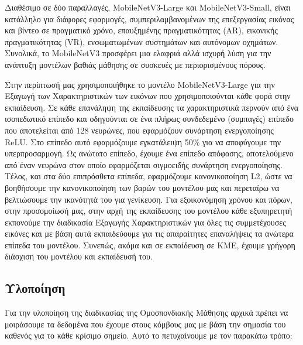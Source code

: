 Διαθέσιμο σε δύο παραλλαγές, MobileNetV3-Large και MobileNetV3-Small, είναι κατάλληλο για διάφορες εφαρμογές, συμπεριλαμβανομένων της επεξεργασίας εικόνας και βίντεο σε πραγματικό χρόνο, επαυξημένης πραγματικότητας (AR), εικονικής πραγματικότητας (VR), ενσωματωμένων συστημάτων και αυτόνομων οχημάτων. Συνολικά, το MobileNetV3 προσφέρει μια ελαφριά αλλά ισχυρή λύση για την ανάπτυξη μοντέλων βαθιάς μάθησης σε συσκευές με περιορισμένους πόρους.

Στην περίπτωσή μας χρησιμοποιήθηκε το μοντέλο MobileNetV3-Large για την Εξαγωγή των Χαρακτηριστικών των εικόνων που χρησιμοποιούνται κάθε φορά στην εκπαίδευση. Σε κάθε επανάληψη της εκπαίδευσης τα χαρακτηριστικά περνούν από ένα ισοπεδωτικό επίπεδο και οδηγούνται σε ένα πλήρως συνδεδεμένο (συμπαγές) επίπεδο που αποτελείται από 128 νευρώνες, που εφαρμόζουν συνάρτηση ενεργοποίησης ReLU. Στο επίπεδο αυτό εφαρμόζουμε εγκατάλειψη 50\% για να αποφύγουμε την υπερπροσαρμογή. Ως ανώτατο επίπεδο, έχουμε ένα επίπεδο απόφασης, αποτελούμενο από έναν νευρώνα στον οποίο εφαρμόζεται σιγμοειδής συνάρτηση ενεργοποίησης. Τέλος, και στα δύο επιπρόσθετα επίπεδα, εφαρμόζουμε κανονικοποίηση L2, ώστε να βοηθήσουμε την κανονικοποίηση των βαρών του μοντέλου μας και περεταίρω να βελτιώσουμε την ικανότητά του για γενίκευση. Για εξοικονόμηση χρόνου και πόρων, στην προσομοίωσή μας, στην αρχή της εκπαίδευσης του μοντέλου κάθε εξυπηρετητή εκπονούμε την διαδικασία Εξαγωγής Χαρακτηριστικών για όλες τις συμμετέχουσες εικόνες και με βάση αυτά εκπαιδεύουμε για τις απαραίτητες επαναλήψεις τα ανώτερα επίπεδα του μοντέλου. Συνεπώς, ακόμα και σε εκπαίδευση σε ΚΜΕ, έχουμε γρήγορη διάσχιση του μοντέλου και εκπαίδευσή του.

\subsection{Υλοποίηση}

\vspace{-3pt}

Για την υλοποίηση της διαδικασίας της Ομοσπονδιακής Μάθησης αρχικά πρέπει να μοιράσουμε τα δεδομένα που έχουμε στους κόμβους μας με βάση την σημασία του καθενός για το κάθε κρίσιμο σημείο. Αυτό το πετυχαίνουμε με τον παρακάτω τρόπο:

